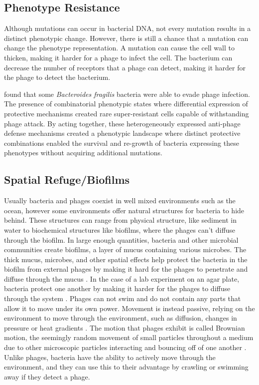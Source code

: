 \subsection{Phenotype Resistance}
Although mutations can occur in bacterial DNA, not every mutation results in a distinct phenotypic change.
However, there is still a chance that a mutation can change the phenotype representation. 
A mutation can cause the cell wall to thicken, making it harder for a phage to infect the cell. 
The bacterium can decrease the number of receptors that a phage can detect, making it harder for the phage to detect the bacterium. 

\citet{guptaCombinatorialPhenotypicLandscape2025} found that some \textit{Bacteroides fragilis} bacteria were able to evade phage infection.  
The presence of combinatorial phenotypic states where differential expression of protective mechanisms created rare super-resistant cells capable of withstanding phage attack.
By acting together, these heterogeneously expressed anti-phage defense mechanisms created a phenotypic landscape where distinct protective combinations enabled the survival and re-growth of bacteria expressing these phenotypes without acquiring additional mutations. 

\subsection{Spatial Refuge/Biofilms} 
Usually bacteria and phages coexist in well mixed environments such as the ocean, however some environments offer natural structures for bacteria to hide behind. 
These structures can range from physical structure, like sediment in water to biochemical structures like biofilms, where the phages can't diffuse through the biofilm. 
In large enough quantities, bacteria and other microbial communities create biofilms, a layer of mucus containing various microbes. 
The thick mucus, microbes, and other spatial effects help protect the bacteria in the biofilm from external phages by making it hard for the phages to penetrate and diffuse through the mucus \cite{abedonPhageDelayEnhancing2017}. 
In the case of a lab experiment on an agar plate, bacteria protect one another by making it harder for the phages to diffuse through the system \cite{eriksenGrowingMicrocolonyCan2018}. \newline
Phages can not swim and do not contain any parts that allow it to move under its own power. 
Movement is instead passive, relying on the environment to move through the environment, such as diffusion, changes in pressure or heat gradients \cite{lohrmannInfluenceBacterialSwimming2024}. 
The motion that phages exhibit is called Brownian motion, the seemingly random movement of small particles throughout a medium due to other microscopic particles interacting and bouncing off of one another \cite{moineauBacteriophage2013}. 
Unlike phages, bacteria have the ability to actively move through the environment, and they can use this to their advantage by crawling or swimming away if they detect a phage. 

